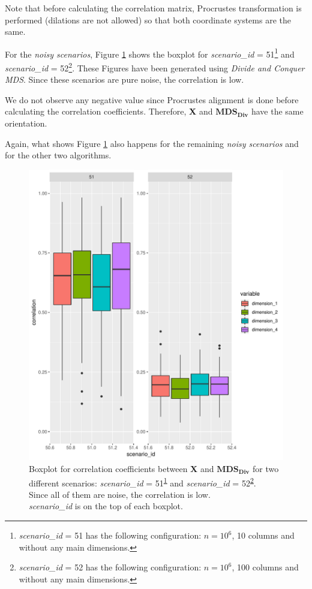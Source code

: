 \documentclass[11pt]{report}
\begin{document}
\indent Note that before calculating the correlation matrix, Procrustes 
transformation is performed (dilations are not allowed) so that both coordinate 
systems are the same.


\indent For the \textit{noisy scenarios}, Figure \ref{noisy_corr_divide} 
shows the boxplot for \textit{scenario\_id} = 51\footnote{\textit{scenario\_id} = 51 
has the following configuration: $n=10^6$, 10 columns and without any main 
dimensions.\label{s51}}  and 
\textit{scenario\_id} = 52\footnote{\textit{scenario\_id} = 52 
has the following configuration: $n=10^6$, 100 columns and without any main 
dimensions.\label{s52}}. These Figures have been generated using  
\textit{Divide and Conquer MDS}. Since these scenarios are pure noise, 
the correlation is low. 

\indent We do not observe any negative value since Procrustes alignment 
is done before calculating the correlation coefficients. Therefore, \textbf{X} 
and $\mathbf{MDS_{Div}}$ have the same orientation. 

\indent Again, what shows Figure \ref{noisy_corr_divide} also happens for 
the remaining \textit{noisy scenarios} and for the other two algorithms.


\begin{figure}
\centering
    \includegraphics[scale = 2.5]{./images/noisy_corr_divide.pdf}
    \caption{
    Boxplot for correlation coefficients between \textbf{X} and 
    $\mathbf{MDS_{Div}}$ for two different scenarios: 
    \textit{scenario\_id} = 51\textsuperscript{\ref{s51}} 
    and \textit{scenario\_id} = 52\textsuperscript{\ref{s52}}. \\ 
    Since all of them are noise, the correlation is low.\\ 
    \textit{scenario\_id} is on the top of each boxplot. 
    } 
    \label{noisy_corr_divide}
\end{figure}
\end{document}
